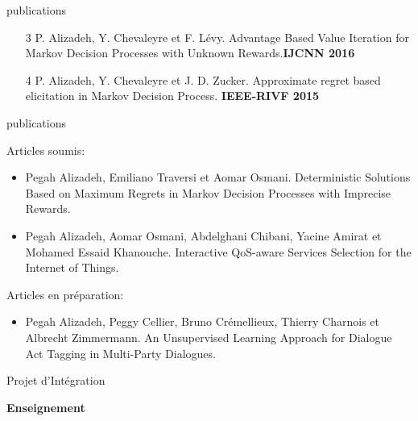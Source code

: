 \documentclass{beamer}
\begin{document}
{{\begin{frame}{publications}
\begin{itemize}
\item [3] P. Alizadeh, Y. Chevaleyre et F. Lévy. Advantage Based Value Iteration for Markov Decision Processes with Unknown Rewards.\textbf{IJCNN 2016}\\

\item [4] P. Alizadeh, Y. Chevaleyre et J. D. Zucker. Approximate regret based elicitation in Markov Decision Process. \textbf{IEEE-RIVF 2015} \\

\end{itemize}

\end{frame}
\begin{frame}{publications}

Articles soumis:\\

\begin{itemize}
	\item Pegah Alizadeh, Emiliano Traversi et Aomar Osmani. Deterministic Solutions Based on Maximum Regrets in Markov Decision Processes with Imprecise Rewards. %
	\item Pegah Alizadeh, Aomar Osmani, Abdelghani Chibani, Yacine Amirat et Mohamed Essaid Khanouche. Interactive QoS-aware Services Selection for the Internet of Things.
\end{itemize}

Articles en préparation:\\
\begin{itemize}
	\item Pegah Alizadeh, Peggy Cellier, Bruno Crémellieux, Thierry Charnois et Albrecht Zimmermann. An Unsupervised Learning Approach for Dialogue Act Tagging in Multi-Party Dialogues. 
\end{itemize}

\end{frame}

\begin{frame}{Projet d'Intégration}

\end{frame}


\begin{frame}
	\begin{center}
	\textbf{Enseignement}
	\end{center}
\end{frame}
{

}}}
\end{document}
